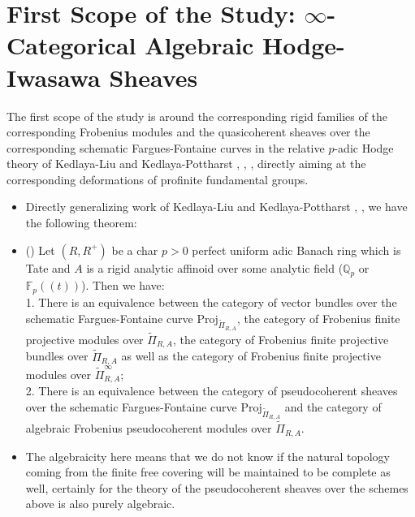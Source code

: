 \documentclass[11pt]{report}
\begin{document}
\section{First Scope of the Study: $\infty$-Categorical Algebraic Hodge-Iwasawa Sheaves}

\indent The first scope of the study is around the corresponding rigid families of the corresponding Frobenius modules and the quasicoherent sheaves over the corresponding schematic Fargues-Fontaine curves in the relative $p$-adic Hodge theory of Kedlaya-Liu and Kedlaya-Pottharst \cite{KL1}, \cite{KL2}, \cite{KP}, directly aiming at the corresponding deformations of profinite fundamental groups. 

\begin{itemize}
\justifying
\item<1-> Directly generalizing work of Kedlaya-Liu and Kedlaya-Pottharst \cite{KL1}, \cite{KL2}, \cite{KP} we have the following theorem:

\item<2-> ()
Let $(R,R^+)$ be a char $p>0$ perfect uniform adic Banach ring which is Tate and $A$ is a rigid analytic affinoid over some analytic field ($\mathbb{Q}_p$ or $\mathbb{F}_p((t))$). Then we have:\\
1. There is an equivalence between the category of vector bundles over the schematic Fargues-Fontaine curve $\mathrm{Proj}_{\widetilde{\Pi}_{R,A}}$, the category of Frobenius finite projective modules over $\widetilde{\Pi}_{R,A}$, the category of Frobenius finite projective bundles over $\widetilde{\Pi}_{R,A}$ as well as the category of Frobenius finite projective modules over $\widetilde{\Pi}^\infty_{R,A}$;\\
2. There is an equivalence between the category of pseudocoherent sheaves over the schematic Fargues-Fontaine curve $\mathrm{Proj}_{\widetilde{\Pi}_{R,A}}$ and the category of algebraic Frobenius pseudocoherent modules over $\widetilde{\Pi}_{R,A}$.\\
 

\item<3-> The algebraicity here means that we do not know if the natural topology coming from the finite free covering will be maintained to be complete as well, certainly for the theory of the pseudocoherent sheaves over the schemes above is also purely algebraic. 


 

\end{itemize}
\end{document}
